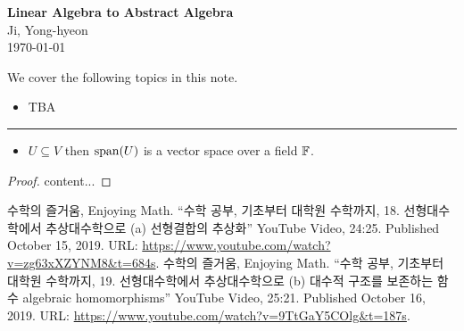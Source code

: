 \documentclass[11pt,openany]{article}
\begin{document}
\begin{center}
	\huge\textbf{Linear Algebra to Abstract Algebra}\\
	\vspace{0.5em}
	\large{Ji, Yong-hyeon}\\
	\vspace{0.5em}
	\normalsize{\today}\\
\end{center}

\noindent 
We cover the following topics in this note.
\begin{itemize}
	\item TBA
\end{itemize}
\hrule\vspace{12pt}
\begin{itemize}
	\item $U\subseteq V$ then $\operatorname{\normalfont span}(U)$ is a vector space over a field $\mathbb{F}$.
\end{itemize}

\probox{\begin{proposition*}
	
\end{proposition*}}
\begin{proof}
	content...
\end{proof}

\vfill
\begin{thebibliography}{9}
	수학의 즐거움, Enjoying Math. ``수학 공부, 기초부터 대학원 수학까지, 18. 선형대수학에서 추상대수학으로 (a) 선형결합의 추상화'' YouTube Video, 24:25. Published 
	October 15, 2019. URL: \url{https://www.youtube.com/watch?v=zg63xXZYNM8&t=684s}.
	수학의 즐거움, Enjoying Math. ``수학 공부, 기초부터 대학원 수학까지, 19. 선형대수학에서 추상대수학으로 (b) 대수적 구조를 보존하는 함수 algebraic homomorphisms'' YouTube Video, 25:21. Published 
	October 16, 2019. URL: \url{https://www.youtube.com/watch?v=9TtGaY5COlg&t=187s}.
\end{thebibliography}
\end{document}
